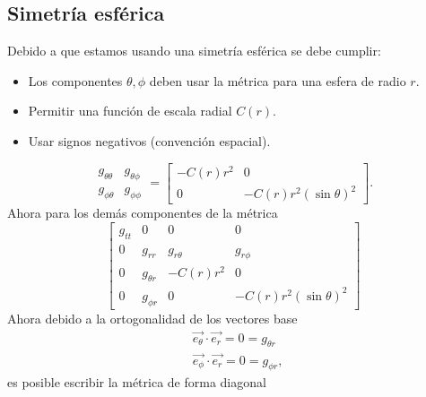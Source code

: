 \subsection{Simetría esférica}
Debido a que estamos usando una simetría esférica se debe cumplir:
\begin{itemize}
    \item Los componentes $\theta, \phi$ deben usar la métrica para una esfera de radio $r$.
    \item Permitir una función de escala radial $C(r)$.
    \item Usar signos negativos (convención espacial).
\end{itemize}

\begin{equation}
    \begin{array}{ll}
        g_{\theta \theta} & g_{\theta \phi} \\
        g_{\phi \theta}   & g_{\phi \phi}
    \end{array} = \left[\begin{array}{cc}
            -C(r) r^2 & 0                        \\
            0         & -C(r) r^2(\sin \theta)^2
        \end{array}\right].
\end{equation}
Ahora para los demás componentes de la métrica 
\begin{equation}
    \left[\begin{array}{cccc}
            g_{t t} & 0            & 0            & 0                        \\
            0       & g_{r r}      & g_{r \theta} & g_{r \phi}               \\
            0       & g_{\theta r} & -C(r) r^2    & 0                        \\
            0       & g_{\phi r}   & 0            & -C(r) r^2(\sin \theta)^2
        \end{array}\right]
\end{equation}
Ahora debido a la ortogonalidad de los vectores base 
\begin{equation}
    \begin{aligned}
         & \overrightarrow{e_\theta} \cdot \overrightarrow{e_r}=0=g_{\theta r} \\
         & \overrightarrow{e_\phi} \cdot \overrightarrow{e_r}=0=g_{\phi r},
    \end{aligned}
\end{equation}
es posible escribir la métrica de forma diagonal 
